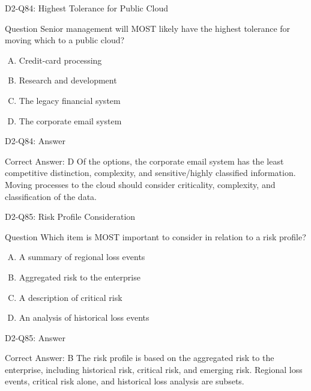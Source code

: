 \documentclass{beamer}
\begin{document}
	\begin{frame}{D2-Q84: Highest Tolerance for Public Cloud}
		\begin{block}{Question}
			Senior management will MOST likely have the highest tolerance for moving which to a public cloud?
		\end{block}
		\begin{enumerate}[(A)]
			\item Credit-card processing
			\item Research and development
			\item The legacy financial system
			\item The corporate email system
		\end{enumerate}
	\end{frame}
	\begin{frame}{D2-Q84: Answer}
		\begin{block}{Correct Answer: D}
			Of the options, the corporate email system has the least competitive distinction, complexity, and sensitive/highly classified information. Moving processes to the cloud should consider criticality, complexity, and classification of the data.
		\end{block}
	\end{frame}
	
	\begin{frame}{D2-Q85: Risk Profile Consideration}
		\begin{block}{Question}
			Which item is MOST important to consider in relation to a risk profile?
		\end{block}
		\begin{enumerate}[(A)]
			\item A summary of regional loss events
			\item Aggregated risk to the enterprise
			\item A description of critical risk
			\item An analysis of historical loss events
		\end{enumerate}
	\end{frame}
	\begin{frame}{D2-Q85: Answer}
		\begin{block}{Correct Answer: B}
			The risk profile is based on the aggregated risk to the enterprise, including historical risk, critical risk, and emerging risk. Regional loss events, critical risk alone, and historical loss analysis are subsets.
		\end{block}
	\end{frame}
	
\end{document}
